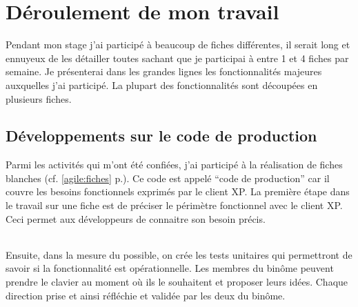 \chapter{Déroulement de mon travail}
Pendant mon stage j'ai participé à beaucoup de fiches différentes, il serait long et ennuyeux de les détailler toutes sachant que je participai à entre 1 et 4 fiches par semaine. Je présenterai dans les grandes lignes les fonctionnalités majeures auxquelles j'ai participé. La plupart des fonctionnalités sont découpées en plusieurs fiches.
\section{Développements sur le code de production}
Parmi les activités qui m'ont été confiées, j'ai participé à la réalisation de fiches blanches (cf. \ref{agile:fiches} p.\pageref{agile:fiches}). Ce code est appelé ``code de production'' car il couvre les besoins fonctionnels exprimés par le client XP. La première étape dans le travail sur une fiche est de préciser le périmètre fonctionnel avec le client XP. Ceci permet aux développeurs de connaitre son besoin précis.
\subparagraph*{}
Ensuite, dans la mesure du possible, on crée les tests unitaires qui permettront de savoir si la fonctionnalité est opérationnelle. Les membres du binôme peuvent prendre le clavier au moment où ils le souhaitent et proposer leurs idées. Chaque direction prise et ainsi réfléchie et validée par les deux du binôme.
